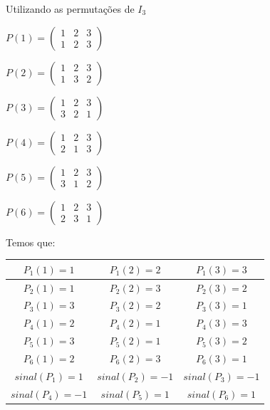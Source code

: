 \documentclass[oneside,a4paper,12pt]{article}
\begin{document}
Utilizando as permutações de $I_3$
\begin{multicols}{3}
	$
	P(1)=
	\left( 
	\begin{array}{ccc}
	1	&	2	&	3	\\
	1	&	2	&	3
	\end{array}
	\right)
	$
	
	$
	P(2)=
	\left( 
	\begin{array}{ccc}
	1	&	2	&	3	\\
	1	&	3	&	2
	\end{array}
	\right)
	$
	
	$
	P(3)=
	\left( 
	\begin{array}{ccc}
	1	&	2	&	3	\\
	3	&	2	&	1
	\end{array}
	\right)
	$
	
	$
	P(4)=
	\left( 
	\begin{array}{ccc}
	1	&	2	&	3	\\
	2	&	1	&	3
	\end{array}
	\right)
	$
	
	$
	P(5)=
	\left( 
	\begin{array}{ccc}
	1	&	2	&	3	\\
	3	&	1	&	2
	\end{array}
	\right)
	$
	
	$
	P(6)=
	\left( 
	\begin{array}{ccc}
	1	&	2	&	3	\\
	2	&	3	&	1
	\end{array}
	\right)
	$
	
\end{multicols}

Temos que:

\begin{table}[h]
	\centering
	\begin{tabular}{|c|c|c|}
		\hline
	$P_1(1)=1$		&	$P_1(2)=2$		&	$P_1(3)=3$	\\
		\hline
	$P_2(1)=1$		&	$P_2(2)=3$		&	$P_2(3)=2$	\\
	\hline	
	$P_3(1)=3$		&	$P_3(2)=2$		&	$P_3(3)=1$	\\
\hline
	$P_4(1)=2$		&	$P_4(2)=1$		&	$P_4(3)=3$	\\
\hline
	$P_5(1)=3$		&	$P_5(2)=1$		&	$P_5(3)=2$	\\
\hline
	$P_6(1)=2$		&	$P_6(2)=3$		&	$P_6(3)=1$	\\
\hline
	$sinal(P_1)=1$	&	$sinal(P_2)=-1$	&	$sinal(P_3)=-1$	\\
\hline	
	$sinal(P_4)=-1$	&	$sinal(P_5)=1$	&	$sinal(P_6)=1$	\\
\hline		
	\end{tabular}
\end{table}
\end{document}
